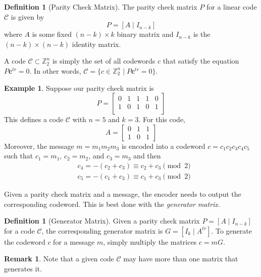 \documentclass[12pt,twoside]{reedthesis}
\theoremstyle{definition}
\newtheorem{definition}[theorem]{Definition}
\newtheorem{example}[theorem]{Example}
\newtheorem{remark}[theorem]{Remark}
\newcommand{\Z}{\mathbb{Z}}
\begin{document}
\begin{definition}[Parity Check Matrix] The parity check matrix $P$ for a linear code $\mathscr{C}$ is given by 
\begin{equation*}
P = [A \mid I_{n-k}]
\end{equation*}
where $A$ is some fixed $(n-k) \times k$ binary matrix and $I_{n-k}$ is the $(n-k)\times(n-k)$ identity matrix.
\end{definition}
A code $\mathscr{C}\subset \Z_2^n$ is simply the set of all codewords $c$ that satisfy the equation $P\mathbf{c}^{tr} = 0$. In other words, $\mathscr{C} = \{c\in \Z_2^n \mid P\mathbf{c}^{tr} = 0\}$.
\begin{example} \label{P_ex} Suppose our parity check matrix is
\begin{equation*}
P = 
\left[
\begin{array}{ccc|cc}
0 & 1 & 1 & 1 & 0 \\
1 & 0 & 1 & 0 & 1\\
\end{array}
\right]
\end{equation*}
This defines a code $\mathscr{C}$ with $n = 5$ and $k = 3$. For this code,
\begin{equation*}
A = 
\begin{bmatrix}
0 & 1 & 1\\
1 & 0 & 1
\end{bmatrix}
\end{equation*}
Moreover, the message $m = m_1m_2m_3$ is encoded into a codeword $c = c_1 c_2 c_3 c_4 c_5$ such that $c_1 = m_1$, $c_2 = m_2$, and $c_3 = m_3$ and then
\begin{align*}
& c_4 = -(c_2 + c_3) \equiv c_2 + c_3 \pmod 2\\
& c_5 =  -(c_1 + c_3) \equiv c_1 + c_3 \pmod 2
\end{align*}
\end{example}

Given a parity check matrix and a message, the encoder needs to output the corresponding codeword. This is best done with the \textit{generator matrix}.

\begin{definition}[Generator Matrix] Given a parity check matrix $P = [A\mid I_{n-k}]$ for a code $\mathscr{C}$, the corresponding generator matrix is $G = [I_k \mid A^{tr}]$.
To generate the codeword $c$ for a message $m$, simply multiply the matrices $c = mG$.
\end{definition}

\begin{remark}
Note that a given code $\mathscr{C}$ may have more than one matrix that generates it.
\end{remark}
\end{document}
